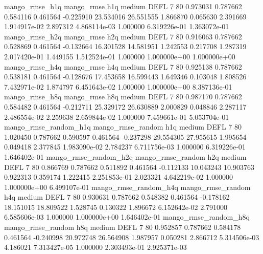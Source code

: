        mango_rmse_h1q        mango_rmse                  h1q     medium     DEFL                 7 80  0.973031       0.787662 0.584116       0.461564   -0.225910     23.534016     26.551555     1.866870       0.065630  2.391669 1.914917e-02     2.897312   4.868114e-03            1.000000    6.319226e-01        1.363072e-01
       mango_rmse_h2q        mango_rmse                  h2q     medium     DEFL                 7 80  0.916063       0.787662 0.528869       0.461564   -0.132664     16.301528     14.581951     1.242553       0.217708  1.287319 2.017420e-01     1.449155   1.512524e-01            1.000000    1.000000e+00        1.000000e+00
       mango_rmse_h4q        mango_rmse                  h4q     medium     DEFL                 7 80  0.925138       0.787662 0.538181       0.461564   -0.128676     17.453658     16.599443     1.649346       0.103048  1.808526 7.432971e-02     1.874797   6.451643e-02            1.000000    1.000000e+00        8.387136e-01
       mango_rmse_h8q        mango_rmse                  h8q     medium     DEFL                 7 80  0.987170       0.787662 0.584482       0.461564   -0.212711     25.329172     26.630889     2.000829       0.048846  2.287117 2.486554e-02     2.259638   2.659844e-02            1.000000    7.459661e-01        5.053704e-01
mango_rmse_random_h1q mango_rmse_random                  h1q     medium     DEFL                 7 80  1.020450       0.787662 0.590597       0.461564   -0.237298     29.554305     27.955615     1.995654       0.049418  2.377845 1.983090e-02     2.784237   6.711756e-03            1.000000    6.319226e-01        1.646402e-01
mango_rmse_random_h2q mango_rmse_random                  h2q     medium     DEFL                 7 80  0.866769       0.787662 0.511892       0.461564   -0.112133     10.043243     10.903763     0.922313       0.359174  1.222415 2.251853e-01     2.023321   4.642219e-02            1.000000    1.000000e+00        6.499107e-01
mango_rmse_random_h4q mango_rmse_random                  h4q     medium     DEFL                 7 80  0.930631       0.787662 0.548382       0.461564   -0.178162     18.151015     18.809522     1.528745       0.130322  1.896672 6.152642e-02     2.791000   6.585606e-03            1.000000    1.000000e+00        1.646402e-01
mango_rmse_random_h8q mango_rmse_random                  h8q     medium     DEFL                 7 80  0.952857       0.787662 0.584178       0.461564   -0.240998     20.972748     26.564908     1.987957       0.050281  2.866712 5.314506e-03     4.186021   7.313427e-05            1.000000    2.303493e-01        2.925371e-03
